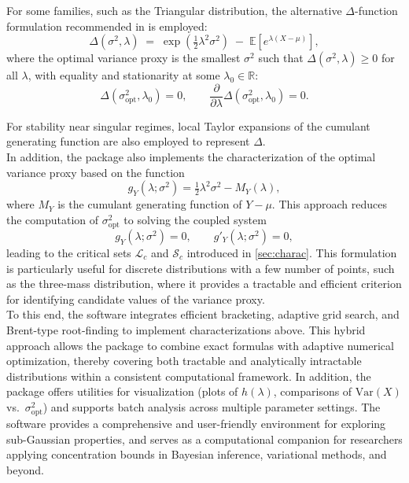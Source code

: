 \documentclass[a4paper, 10pt]{article}
\theoremstyle{definition}
\begin{document}
For some families, such as the Triangular distribution, the alternative $\Delta$-function formulation recommended in \cite{arbel2020strict} is employed: 
\[
\Delta(\sigma^{2}, \lambda) \;=\; \exp\!\left(\tfrac{1}{2}\lambda^{2}\sigma^{2}\right) \;-\; \mathbb{E}\!\left[e^{\lambda(X-\mu)}\right],
\]
where the optimal variance proxy is the smallest $\sigma^{2}$ such that $\Delta(\sigma^{2}, \lambda) \geq 0$ for all $\lambda$, with equality and stationarity at some $\lambda_0 \in \mathbb{R}$:
\[
\Delta(\sigma_{\mathrm{opt}}^{2}, \lambda_0) = 0, 
\qquad 
\frac{\partial}{\partial \lambda}\Delta(\sigma_{\mathrm{opt}}^{2}, \lambda_0) = 0.
\]

For stability near singular regimes, local Taylor expansions of the cumulant generating function are also employed to represent $\Delta$.\\

In addition, the package also implements the characterization of the optimal variance proxy based on the function 
\[
g_Y(\lambda;\sigma^2)=\tfrac{1}{2}\lambda^2\sigma^2 - M_Y(\lambda),
\]
where $M_Y$ is the cumulant generating function of $Y-\mu$. 
This approach reduces the computation of $\sigma^2_{\mathrm{opt}}$ to solving the coupled system 
\[
g_Y(\lambda;\sigma^2)=0, \qquad g'_Y(\lambda;\sigma^2)=0,
\]
leading to the critical sets $\mathcal{L}_c$ and $\mathcal{S}_c$ introduced in \autoref{sec:charac}. 
This formulation is particularly useful for discrete distributions with a few number of points, such as the three-mass distribution, where it provides a tractable and efficient criterion for identifying candidate values of the variance proxy.\\
To this end, the software integrates efficient bracketing, adaptive grid search, and Brent-type root-finding to implement characterizations above.
This hybrid approach allows the package to combine exact formulas with adaptive numerical optimization, thereby covering both tractable and analytically intractable distributions within a consistent computational framework. 
In addition, the package offers utilities for visualization (plots of $h(\lambda)$, comparisons of $\mathrm{Var}(X)$ vs.\ $\sigma^2_{\text{opt}}$) and supports batch analysis across multiple parameter settings. 
The software provides a comprehensive and user-friendly environment for exploring sub-Gaussian properties, and serves as a computational companion for researchers applying concentration bounds in Bayesian inference, variational methods, and beyond.\\
\end{document}
